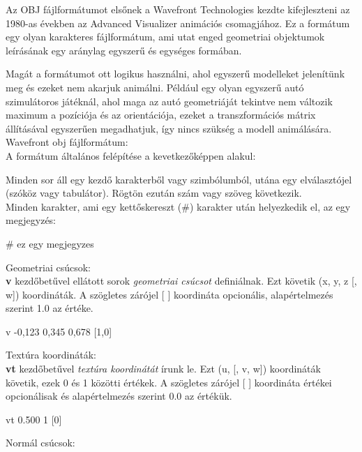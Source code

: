 
Az OBJ fájlformátumot elsőnek a Wavefront Technologies kezdte kifejleszteni az 1980-as években az Advanced Visualizer animációs csomagjához. Ez a formátum egy olyan karakteres fájlformátum, ami utat enged geometriai objektumok leírásának egy aránylag egyszerű és egységes formában.\cite{martinreddy}

Magát a formátumot ott logikus használni, ahol egyszerű modelleket jelenítünk meg és ezeket nem akarjuk animálni. Például egy olyan egyszerű autó szimulátoros játéknál, ahol maga az autó geometriáját tekintve nem változik maximum a pozíciója és az orientációja, ezeket a transzformációs mátrix állításával egyszerűen megadhatjuk, így nincs szükség a modell animálására.\\

\noindent Wavefront obj fájlformátum:\\

\noindent A formátum általános felépítése a kevetkezőképpen alakul:

Minden sor áll egy kezdő karakterből vagy szimbólumból, utána egy elválasztójel (szóköz vagy tabulátor). Rögtön ezután szám vagy szöveg következik.\\

\noindent Minden karakter, ami egy kettőskereszt (\#) karakter után helyezkedik el, az egy megjegyzés:

\bigskip
\begin{python}
# ez egy megjegyzes
\end{python}
\bigskip
Geometriai csúcsok:\\

\noindent \textbf{v} kezdőbetűvel ellátott sorok \textsl{geometriai csúcsot} definiálnak. Ezt követik (x, y, z [, w]) koordináták. A szögletes zárójel [ ] koordináta opcionális, alapértelmezés szerint 1.0 az értéke.
\bigskip
\begin{python} 
v -0,123 0,345 0,678 [1,0]
\end{python}
\newpage
\noindent Textúra koordináták:\\

\noindent \textbf{vt} kezdőbetűvel \textsl{textúra koordinátát} írunk le. Ezt (u, [, v, w]) koordináták követik, ezek 0 és 1 közötti értékek. A szögletes zárójel [ ] koordináta értékei opcionálisak és alapértelmezés szerint 0.0 az értékük.

\bigskip
\begin{python} 
vt 0.500 1 [0]
\end{python}
\bigskip
Normál csúcsok:\\


